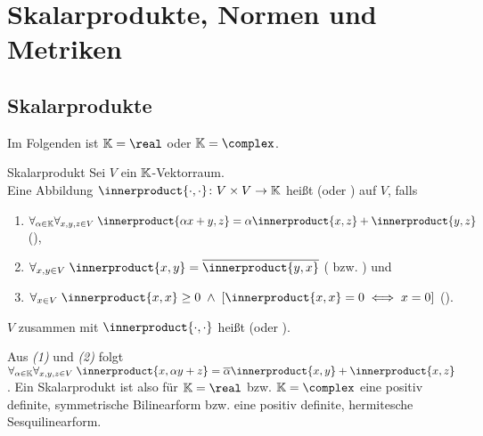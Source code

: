\chapter{%
    Skalarprodukte, Normen und Metriken%
}

\section{%
    Skalarprodukte%
}

\begin{Bem}
    Im Folgenden ist $\KK = \real$ oder $\KK = \complex$.
\end{Bem}

\begin{Def}{Skalarprodukt}
    Sei $V$ ein $\mathbb{K}$-Vektorraum.\\
    Eine Abbildung $\innerproduct{\cdot, \cdot}\colon V \times V \rightarrow \KK$ heißt
     (oder ) auf $V$, falls
    \begin{enumerate}
        \item
        $\forall_{\alpha \in \KK} \forall_{x, y, z \in V}\;
        \innerproduct{\alpha x + y, z} = \alpha \innerproduct{x, z} + \innerproduct{y, z}$
        (),

        \item
        $\forall_{x, y \in V}\; \innerproduct{x, y} = \kk{\innerproduct{y, x}}$
        ( bzw. ) und

        \item
        $\forall_{x \in V}\; \innerproduct{x, x} \ge 0 \;\land\; \left[\innerproduct{x, x} = 0 \iff x = 0\right]$
        ().
    \end{enumerate}
    $V$ zusammen mit $\innerproduct{\cdot, \cdot}$ heißt 
    (oder ).
\end{Def}

\begin{Bem}
    Aus \emph{(1)} und \emph{(2)} folgt
    $\forall_{\alpha \in \KK} \forall_{x, y, z \in V}\; \innerproduct{x, \alpha y + z} =
    \kk{\alpha} \innerproduct{x, y} + \innerproduct{x, z}$.
    Ein Skalarprodukt ist also für $\KK = \real$ bzw. $\KK = \complex$
    eine positiv definite, symmetrische Bilinearform bzw.
    eine positiv definite, hermitesche Sesquilinearform.
\end{Bem}

